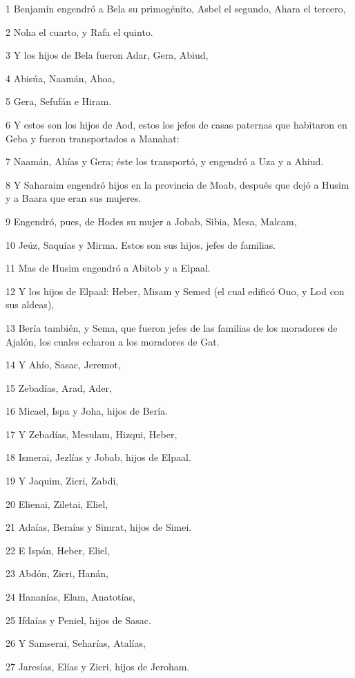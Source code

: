 \par 1 Benjamín engendró a Bela su primogénito, Asbel el segundo, Ahara el tercero,
\par 2 Noha el cuarto, y Rafa el quinto.
\par 3 Y los hijos de Bela fueron Adar, Gera, Abiud,
\par 4 Abisúa, Naamán, Ahoa,
\par 5 Gera, Sefufán e Hiram. 
\par 6 Y estos son los hijos de Aod, estos los jefes de casas paternas que habitaron en Geba y fueron transportados a Manahat:
\par 7 Naamán, Ahías y Gera; éste los transportó, y engendró a Uza y a Ahiud.
\par 8 Y Saharaim engendró hijos en la provincia de Moab, después que dejó a Husim y a Baara que eran sus mujeres.
\par 9 Engendró, pues, de Hodes su mujer a Jobab, Sibia, Mesa, Malcam,
\par 10 Jeúz, Saquías y Mirma. Estos son sus hijos, jefes de familias.
\par 11 Mas de Husim engendró a Abitob y a Elpaal.
\par 12 Y los hijos de Elpaal: Heber, Misam y Semed (el cual edificó Ono, y Lod con sus aldeas),
\par 13 Bería también, y Sema, que fueron jefes de las familias de los moradores de Ajalón, los cuales echaron a los moradores de Gat.
\par 14 Y Ahío, Sasac, Jeremot,
\par 15 Zebadías, Arad, Ader,
\par 16 Micael, Ispa y Joha, hijos de Bería.
\par 17 Y Zebadías, Mesulam, Hizqui, Heber,
\par 18 Ismerai, Jezlías y Jobab, hijos de Elpaal.
\par 19 Y Jaquim, Zicri, Zabdi,
\par 20 Elienai, Ziletai, Eliel,
\par 21 Adaías, Beraías y Simrat, hijos de Simei.
\par 22 E Ispán, Heber, Eliel,
\par 23 Abdón, Zicri, Hanán,
\par 24 Hananías, Elam, Anatotías,
\par 25 Ifdaías y Peniel, hijos de Sasac.
\par 26 Y Samserai, Seharías, Atalías,
\par 27 Jaresías, Elías y Zicri, hijos de Jeroham.
